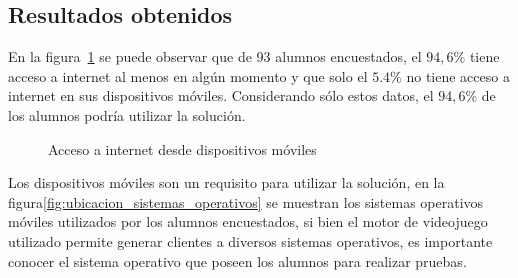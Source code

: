 \subsection{Resultados obtenidos}




En la figura~\ref{fig:ubicacion_acceso_internet} se puede observar que de 93 alumnos 
encuestados, el $94,6\%$ tiene acceso a internet al menos en algún momento y que
solo el $5.4\%$ no tiene acceso a internet en sus dispositivos móviles. Considerando 
sólo estos datos, el $94,6\%$ de los alumnos podría utilizar la solución.



 \begin{figure}[H]
        \centering
        \caption{Acceso a internet desde dispositivos móviles}
        \label{fig:ubicacion_acceso_internet}
\end{figure}


Los dispositivos móviles son un requisito para utilizar la solución, 
en la figura\ref{fig:ubicacion_sistemas_operativos} se muestran los sistemas operativos
móviles utilizados por los alumnos encuestados, si bien el motor de videojuego 
utilizado permite generar clientes a diversos sistemas operativos, es importante conocer el sistema
operativo que poseen los alumnos para realizar pruebas.

